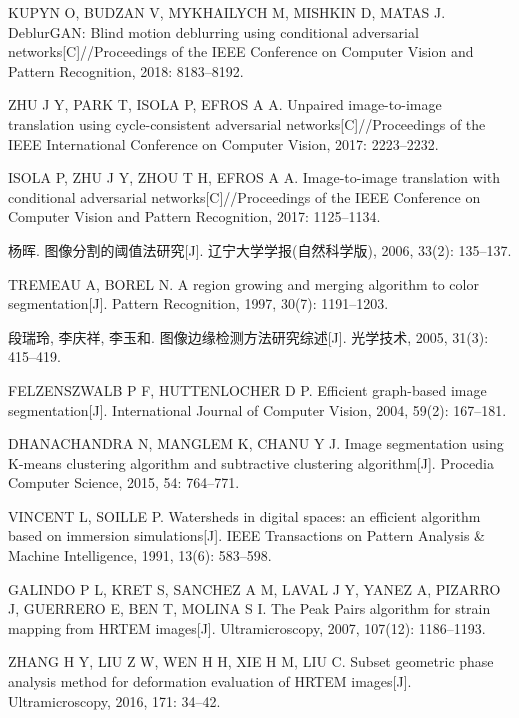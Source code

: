 KUPYN O, BUDZAN V, MYKHAILYCH M, MISHKIN D, MATAS J. DeblurGAN: Blind motion deblurring using conditional adversarial networks[C]//Proceedings of the IEEE Conference on Computer Vision and Pattern Recognition, 2018: 8183--8192.

ZHU J Y, PARK T, ISOLA P, EFROS A A. Unpaired image-to-image translation using cycle-consistent adversarial networks[C]//Proceedings of the IEEE International Conference on Computer Vision, 2017: 2223--2232.

ISOLA P, ZHU J Y, ZHOU T H, EFROS A A. Image-to-image translation with conditional adversarial networks[C]//Proceedings of the IEEE Conference on Computer Vision and Pattern Recognition, 2017: 1125--1134.

杨晖. 图像分割的阈值法研究[J]. 辽宁大学学报(自然科学版), 2006, 33(2): 135--137.

TREMEAU A, BOREL N. A region growing and merging algorithm to color segmentation[J]. Pattern Recognition, 1997, 30(7): 1191--1203.

段瑞玲, 李庆祥, 李玉和. 图像边缘检测方法研究综述[J]. 光学技术, 2005, 31(3): 415--419.

FELZENSZWALB P F, HUTTENLOCHER D P. Efficient graph-based image segmentation[J]. International Journal of Computer Vision, 2004, 59(2): 167--181.

DHANACHANDRA N, MANGLEM K, CHANU Y J. Image segmentation using K-means clustering algorithm and subtractive clustering algorithm[J]. Procedia Computer Science, 2015, 54: 764--771.

VINCENT L, SOILLE P. Watersheds in digital spaces: an efficient algorithm based on immersion simulations[J]. IEEE Transactions on Pattern Analysis \& Machine Intelligence, 1991, 13(6): 583--598.

GALINDO P L, KRET S, SANCHEZ A M, LAVAL J Y, YANEZ A, PIZARRO J, GUERRERO E, BEN T, MOLINA S I. The Peak Pairs algorithm for strain mapping from HRTEM images[J]. Ultramicroscopy, 2007, 107(12): 1186--1193.

ZHANG H Y, LIU Z W, WEN H H, XIE H M, LIU C. Subset geometric phase analysis method for deformation evaluation of HRTEM images[J]. Ultramicroscopy, 2016, 171: 34--42.

